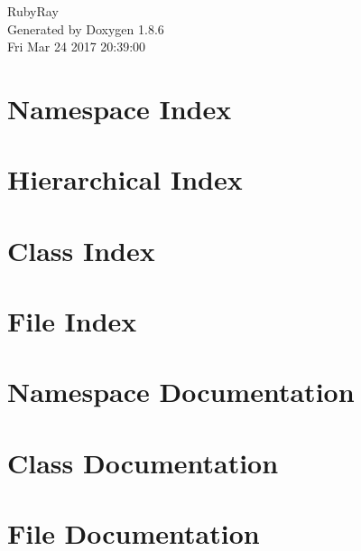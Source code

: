 \documentclass[twoside]{book}
\newcommand{\clearemptydoublepage}{%
  \newpage{\pagestyle{empty}\cleardoublepage}%
}
\begin{document}
\hypersetup{pageanchor=false}
\begin{titlepage}
\vspace*{7cm}
\begin{center}%
{\Large Ruby\-Ray }\\
\vspace*{1cm}
{\large Generated by Doxygen 1.8.6}\\
\vspace*{0.5cm}
{\small Fri Mar 24 2017 20:39:00}\\
\end{center}
\end{titlepage}
\clearemptydoublepage
\tableofcontents
\clearemptydoublepage
{}
\hypersetup{pageanchor=true}

\chapter{Namespace Index}

\chapter{Hierarchical Index}

\chapter{Class Index}

\chapter{File Index}

\chapter{Namespace Documentation}

\chapter{Class Documentation}

















\chapter{File Documentation}






















\newpage
{}
{}
\printindex
\end{document}
